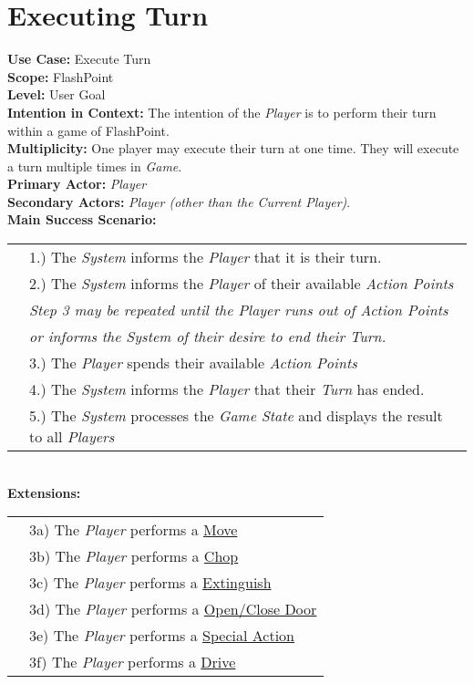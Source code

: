 \documentclass{article}
\begin{document}
	\section*{Executing Turn}
	\textbf{Use Case:} Execute Turn\\
	\textbf{Scope:} FlashPoint\\
	\textbf{Level:} User Goal\\
	\textbf{Intention in Context: } The intention of the \textit{Player} is to perform their turn within a game of FlashPoint.\\
	\textbf{Multiplicity: } One player may execute their turn at one time. They will execute a turn multiple times in \textit{Game}.\\
	\textbf{Primary Actor:} \textit{Player} \\
	\textbf{Secondary Actors:} \textit{Player (other than the Current Player)}.\\
	\textbf{Main Success Scenario:}\\
	\begin{tabular}{l l}
		&1.) The \textit{System} informs the \textit{Player} that it is their turn.\\
		&2.) The \textit{System} informs the \textit{Player} of their available \textit{Action Points}\\
		&\textit{Step 3 may be repeated until the Player runs out of Action Points}\\
		&\qquad \textit{or informs the System of their desire to end their Turn.}\\
		&3.) The \textit{Player} spends their available \textit{Action Points}\\
		&4.) The \textit{System} informs the \textit{Player} that their \textit{Turn} has ended.\\
		&5.) The \textit{System} processes the \textit{Game State} and displays the result to all \textit{Players}
	\end{tabular}\\
	\textbf{Extensions: }\\
	\begin{tabular}{l l}
		&3a) The \textit{Player} performs a \underline{Move}\\
		&3b) The \textit{Player} performs a \underline{Chop}\\
		&3c) The \textit{Player} performs a \underline{Extinguish}\\
		&3d) The \textit{Player} performs a \underline{Open/Close Door}\\
		&3e) The \textit{Player} performs a \underline{Special Action}\\
		&3f) The \textit{Player} performs a  \underline{Drive}
	\end{tabular}
	
\end{document}
